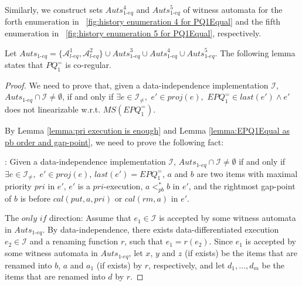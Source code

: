 Similarly, we construct sets $\textit{Auts}_{\textit{1-eq}}^{4}$ and $\textit{Auts}_{\textit{1-eq}}^{5}$ of witness automata for the forth enumeration in \figurename~\ref{fig:history enumeration 4 for PQ1Equal} and the fifth enumeration in \figurename~\ref{fig:history enumeration 5 for PQ1Equal}, respectively.

Let $\textit{Auts}_{\textit{1-eq}} = \{ \mathcal{A}_{\textit{l-eq}}^1, \mathcal{A}_{\textit{l-eq}}^2 \} \cup \textit{Auts}_{\textit{1-eq}}^{3} \cup \textit{Auts}_{\textit{1-eq}}^{4} \cup \textit{Auts}_{\textit{1-eq}}^{5}$. The following lemma states that $\textit{PQ}_1^{=}$ is co-regular.


\EPQOneEqualIsCoRegular*

\begin {proof}

We need to prove that, given a data-independence implementation $\mathcal{I}$, $\textit{Auts}_{\textit{1-eq}} \cap \mathcal{I} \neq \emptyset$, if and only if $\exists e \in \mathcal{I}_{\neq},$ $e' \in \textit{proj}(e),$ $\textit{EPQ}_1^{=} \in \textit{last}(e') \wedge e'$ does not linearizable w.r.t. $\textit{MS}(\textit{EPQ}_1^{=})$.

By Lemma \ref{lemma:pri execution is enough} and Lemma \ref{lemma:EPQ1Equal as pb order and gap-point}, we need to prove the following fact:

: Given a data-independence implementation $\mathcal{I}$, $\textit{Auts}_{\textit{1-eq}} \cap \mathcal{I} \neq \emptyset$ if and only if $\exists e \in \mathcal{I}_{\neq},$ $e' \in \textit{proj}(e)$, $\textit{last}(e')=\textit{EPQ}_1^{=}$, $a$ and $b$ are two items with maximal priority $\textit{pri}$ in $e'$, $e'$ is a $\textit{pri}$-execution, $a <_{\textit{pb}}^* b$ in $e'$, and the rightmost gap-point of $b$ is before $\textit{cal}(\textit{put},a,\textit{pri})$ or $\textit{cal}(\textit{rm},a)$ in $e'$.

\noindent The $\textit{only if}$ direction: Assume that $e_1 \in \mathcal{I}$ is accepted by some witness automata in $\textit{Auts}_{\textit{1-eq}}$. By data-independence, there exists data-differentiated execution $e_2 \in \mathcal{I}$ and a renaming function $r$, such that $e_1=r(e_2)$. Since $e_1$ is accepted by some witness automata in  $\textit{Auts}_{\textit{1-eq}}$, let $x$, $y$ and $z$ (if exists) be the items that are renamed into $b$, $a$ and $a_1$ (if exists) by $r$, respectively, and let $d_1,\ldots,d_m$ be the items that are renamed into $d$ by $r$.


\end{proof}

